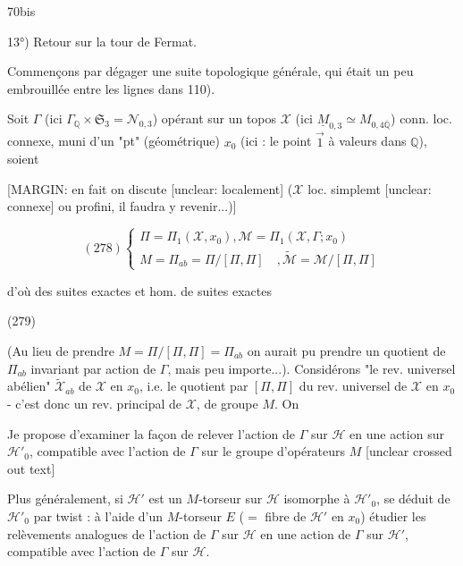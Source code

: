 \newpage


70bis

13°) Retour sur la tour de Fermat.

Commençons par dégager une suite topologique générale, qui était un peu embrouillée entre les lignes dans 110).

Soit $\Gamma$ (ici $\Gamma_{\mathbb{Q}} \times \mathfrak{S}_3 = \mathcal{N}_{0,3}$) opérant sur un topos $\mathcal{X}$ (ici $\underline{M}_{0,3} \simeq M_{0,4 \overline{\mathbb{Q}}}$) conn. loc. connexe, muni d'un "pt" (géométrique) $x_0$ (ici : le point $\vec{1}$ à valeurs dans $\mathbb{Q}$), soient

[MARGIN: en fait on discute [unclear: localement] ($\mathcal{X}$ loc. simplemt [unclear: connexe] ou profini, il faudra y revenir...)]

$$ (278) \begin{cases} \Pi = \Pi_1(\mathcal{X}, x_0), \mathcal{M} = \Pi_1(\mathcal{X}, \Gamma; x_0) \\ M = \Pi_{ab} = \Pi/[\Pi,\Pi] \quad, \tilde{\mathcal{M}} = \mathcal{M}/[\Pi,\Pi] \end{cases} $$

d'où des suites exactes et hom. de suites exactes

(279)

(Au lieu de prendre $M = \Pi/[\Pi,\Pi] = \Pi_{ab}$ on aurait pu prendre un quotient de $\Pi_{ab}$ invariant par action de $\Gamma$, mais peu importe...). Considérons "le rev. universel abélien" $\tilde{\mathcal{X}}_{ab}$ de $\mathcal{X}$ en $x_0$, i.e. le quotient par $[\Pi,\Pi]$ du rev. universel de $\mathcal{X}$ en $x_0$ - c'est donc un rev. principal de $\mathcal{X}$, de groupe $M$. On

\newpage


Je propose d'examiner la façon de relever l'action de $\Gamma$ sur $\mathcal{H}$ en une action sur $\mathcal{H}'_0$, compatible avec l'action de $\Gamma$ sur le groupe d'opérateurs $M$
[unclear crossed out text]

Plus généralement, si $\mathcal{H}'$ est un $M$-torseur sur $\mathcal{H}$ isomorphe à $\mathcal{H}'_0$, se déduit de $\mathcal{H}'_0$ par twist : à l'aide d'un $M$-torseur $E$ ($=$ fibre de $\mathcal{H}'$ en $x_0$) étudier les relèvements analogues de l'action de $\Gamma$ sur $\mathcal{H}$ en une action de $\Gamma$ sur $\mathcal{H}'$, compatible avec l'action de $\Gamma$ sur $\mathcal{H}$.

